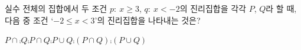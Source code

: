 실수 전체의 집합에서 두 조건 $p:\ x\ge 3$, $q:\ x<-2$의 진리집합을 각각 $P$, $Q$라 할 때, 다음 중 조건 ‘$-2\le x<3$’의 진리집합을 나타내는 것은?
\begin{choices32}{$P\cap\comp{Q}$}{$\comp{P}\cap Q$}{$\comp{P}\cup Q$}{$\comp{(P\cap Q)}$}{$\comp{(P\cup Q)}$}\end{choices32}
